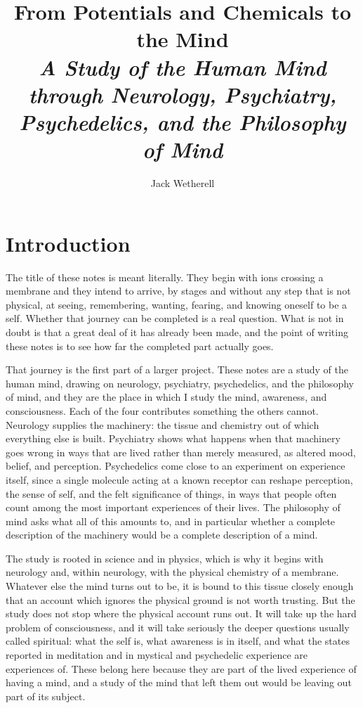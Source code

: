 \documentclass[11pt]{article}
\title{\textbf{From Potentials and Chemicals to the Mind} \\
\large \textit{A Study of the Human Mind through Neurology, Psychiatry,} \\
\large \textit{Psychedelics, and the Philosophy of Mind}}
\author{Jack Wetherell}
\date{}
\begin{document}
\maketitle
\tableofcontents
\newpage

\section*{Introduction}

The title of these notes is meant literally. They begin with ions crossing a membrane and they intend to arrive, by stages and without any step that is not physical, at seeing, remembering, wanting, fearing, and knowing oneself to be a self. Whether that journey can be completed is a real question. What is not in doubt is that a great deal of it has already been made, and the point of writing these notes is to see how far the completed part actually goes.

That journey is the first part of a larger project. These notes are a study of the human mind, drawing on neurology, psychiatry, psychedelics, and the philosophy of mind, and they are the place in which I study the mind, awareness, and consciousness. Each of the four contributes something the others cannot. Neurology supplies the machinery: the tissue and chemistry out of which everything else is built. Psychiatry shows what happens when that machinery goes wrong in ways that are lived rather than merely measured, as altered mood, belief, and perception. Psychedelics come close to an experiment on experience itself, since a single molecule acting at a known receptor can reshape perception, the sense of self, and the felt significance of things, in ways that people often count among the most important experiences of their lives. The philosophy of mind asks what all of this amounts to, and in particular whether a complete description of the machinery would be a complete description of a mind.

The study is rooted in science and in physics, which is why it begins with neurology and, within neurology, with the physical chemistry of a membrane. Whatever else the mind turns out to be, it is bound to this tissue closely enough that an account which ignores the physical ground is not worth trusting. But the study does not stop where the physical account runs out. It will take up the hard problem of consciousness, and it will take seriously the deeper questions usually called spiritual: what the self is, what awareness is in itself, and what the states reported in meditation and in mystical and psychedelic experience are experiences of. These belong here because they are part of the lived experience of having a mind, and a study of the mind that left them out would be leaving out part of its subject.
\end{document}
